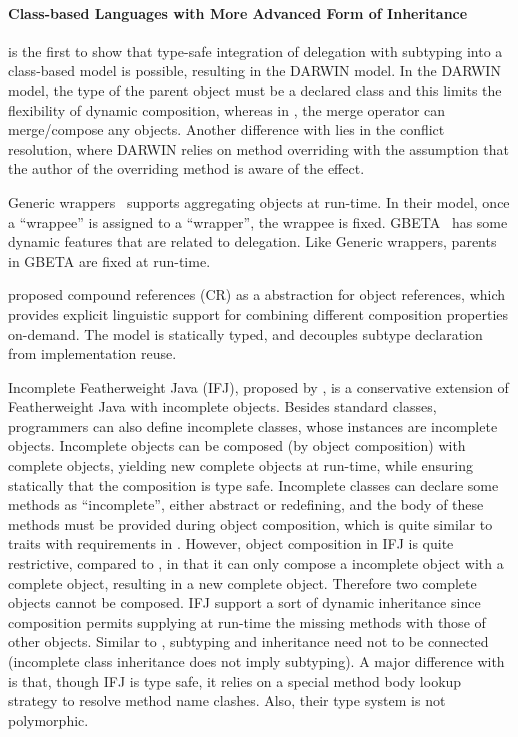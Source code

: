 \paragraph{Class-based Languages with More Advanced Form of Inheritance}

\citet{kniesel1999type} is the first to show that type-safe integration of
delegation with subtyping into a class-based model is possible, resulting in the
DARWIN model. In the DARWIN model, the type of the parent object must be a
declared class and this limits the flexibility of dynamic composition, whereas
in \name, the merge operator can merge/compose any objects. Another difference
with \name lies in the conflict resolution, where DARWIN relies on method
overriding with the assumption that the author of the overriding method is aware
of the effect.

Generic wrappers~\cite{buchi2000generic} supports aggregating objects at
run-time. In their model, once a ``wrappee'' is assigned to a ``wrapper'', the
wrappee is fixed. GBETA~\cite{ernst2000gbeta} has some dynamic features that are
related to delegation. Like Generic wrappers, parents in GBETA are fixed at
run-time.

\citet{ostermann2001object} proposed compound references (CR) as a abstraction
for object references, which provides explicit linguistic support for combining
different composition properties on-demand. The model is statically typed, and
decouples subtype declaration from implementation reuse.

Incomplete Featherweight Java (IFJ), proposed by \citet{bettini2008type}, is a
conservative extension of Featherweight Java with incomplete objects. Besides
standard classes, programmers can also define incomplete classes, whose
instances are incomplete objects. Incomplete objects can be composed (by object
composition) with complete objects, yielding new complete objects at run-time,
while ensuring statically that the composition is type safe. Incomplete classes
can declare some methods as ``incomplete'', either abstract or redefining, and
the body of these methods must be provided during object composition, which is
quite similar to traits with requirements in \name. However, object composition
in IFJ is quite restrictive, compared to \name, in that it can only compose a
incomplete object with a complete object, resulting in a new complete object.
Therefore two complete objects cannot be composed. IFJ support a sort of dynamic
inheritance since composition permits supplying at run-time the missing methods
with those of other objects. Similar to \name, subtyping and inheritance need
not to be connected (incomplete class inheritance does not imply subtyping). A
major difference with \name is that, though IFJ is type safe, it relies on a
special method body lookup strategy to resolve method name clashes. Also, their
type system is not polymorphic.

